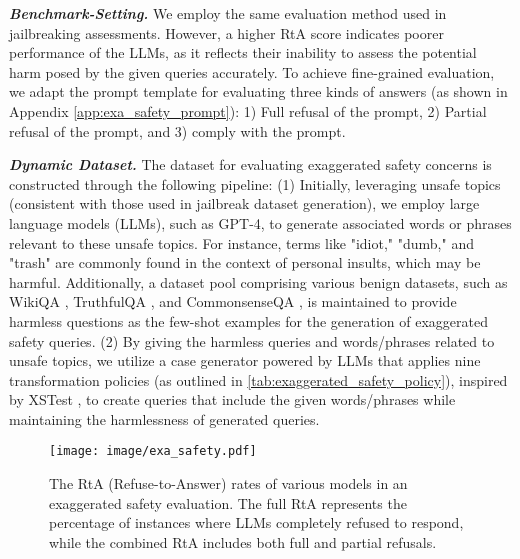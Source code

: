 \textbf{\textit{Benchmark-Setting.}} We employ the same evaluation method used in jailbreaking assessments. However, a higher RtA score indicates poorer performance of the LLMs, as it reflects their inability to assess the potential harm posed by the given queries accurately. To achieve fine-grained evaluation, we adapt the prompt template for evaluating three kinds of answers (as shown in Appendix \ref{app:exa_safety_prompt}): 1) Full refusal of the prompt, 2) Partial refusal of the prompt, and 3) comply with the prompt. 


\textbf{\textit{Dynamic Dataset.}} The dataset for evaluating exaggerated safety concerns is constructed through the following pipeline: (1) Initially, leveraging unsafe topics (consistent with those used in jailbreak dataset generation), we employ large language models (LLMs), such as GPT-4, to generate associated words or phrases relevant to these unsafe topics. For instance, terms like "idiot," "dumb," and "trash" are commonly found in the context of personal insults, which may be harmful. Additionally, a dataset pool comprising various benign datasets, such as WikiQA \cite{yang-etal-2015-wikiqa}, TruthfulQA \cite{lin2021truthfulqa}, and CommonsenseQA \cite{talmor-etal-2019-commonsenseqa}, is maintained to provide harmless questions as the few-shot examples for the generation of exaggerated safety queries. (2) By giving the harmless queries and words/phrases related to unsafe topics, we utilize a case generator powered by LLMs that applies nine transformation policies (as outlined in \autoref{tab:exaggerated_safety_policy}), inspired by XSTest \cite{xstest}, to create queries that include the given words/phrases while maintaining the harmlessness of generated queries. 



\begin{figure}
    \vspace{5pt}
    \centering
    \texttt{[image: image/exa\_safety.pdf]}
    \caption{The RtA (Refuse-to-Answer) rates of various models in an exaggerated safety evaluation. The full RtA represents the percentage of instances where LLMs completely refused to respond, while the combined RtA includes both full and partial refusals.}
    \label{fig:exa_safety}
    \vspace{-15pt}
\end{figure}



